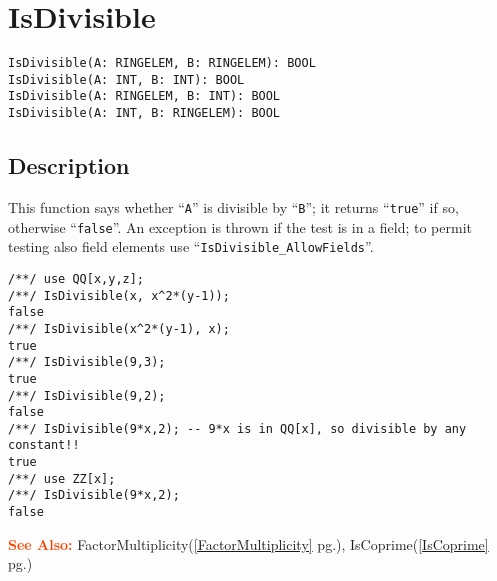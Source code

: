\documentclass[a4paper]{mybook}
\newenvironment{command}{}{} %
\newcommand\SeeAlso{\par\textcolor{OrangeRed}{\textbf{\large See Also: }}}
\begin{document}
\section{IsDivisible}
\label{IsDivisible}
\begin{command} %


\begin{Verbatim}[label=syntax, rulecolor=\color{MidnightBlue},
frame=single]
IsDivisible(A: RINGELEM, B: RINGELEM): BOOL
IsDivisible(A: INT, B: INT): BOOL
IsDivisible(A: RINGELEM, B: INT): BOOL
IsDivisible(A: INT, B: RINGELEM): BOOL
\end{Verbatim}


\subsection*{Description}

This function says whether ``\verb&A&'' is divisible by ``\verb&B&''; it returns ``\verb&true&'' if so,
otherwise ``\verb&false&''.  An exception is thrown if the test is in a field; to
permit testing also field elements use ``\verb&IsDivisible_AllowFields&''.
\begin{Verbatim}[label=example, rulecolor=\color{PineGreen}, frame=single]
/**/ use QQ[x,y,z];
/**/ IsDivisible(x, x^2*(y-1));
false
/**/ IsDivisible(x^2*(y-1), x);
true
/**/ IsDivisible(9,3);
true
/**/ IsDivisible(9,2);
false
/**/ IsDivisible(9*x,2); -- 9*x is in QQ[x], so divisible by any constant!!
true
/**/ use ZZ[x];
/**/ IsDivisible(9*x,2);
false
\end{Verbatim}


\SeeAlso %
  FactorMultiplicity(\ref{FactorMultiplicity} pg.\pageref{FactorMultiplicity}), 
    IsCoprime(\ref{IsCoprime} pg.\pageref{IsCoprime})
\end{command} %
\end{document}
